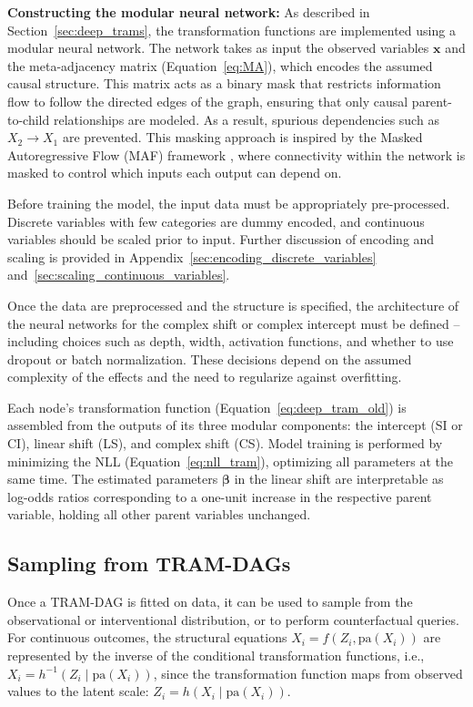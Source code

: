 \textbf{Constructing the modular neural network:} As described in Section~\ref{sec:deep_trams}, the transformation functions are implemented using a modular neural network. The network takes as input the observed variables $\mathbf{x}$ and the meta-adjacency matrix (Equation~\ref{eq:MA}), which encodes the assumed causal structure. This matrix acts as a binary mask that restricts information flow to follow the directed edges of the graph, ensuring that only causal parent-to-child relationships are modeled. As a result, spurious dependencies such as $X_2 \rightarrow X_1$ are prevented. This masking approach is inspired by the Masked Autoregressive Flow (MAF) framework \citep{papamakarios2017}, where connectivity within the network is masked to control which inputs each output can depend on.

Before training the model, the input data must be appropriately pre-processed. Discrete variables with few categories are dummy encoded, and continuous variables should be scaled prior to input. Further discussion of encoding and scaling is provided in Appendix~\ref{sec:encoding_discrete_variables} and~\ref{sec:scaling_continuous_variables}.

Once the data are preprocessed and the structure is specified, the architecture of the neural networks for the complex shift or complex intercept must be defined -- including choices such as depth, width, activation functions, and whether to use dropout or batch normalization. These decisions depend on the assumed complexity of the effects and the need to regularize against overfitting.

Each node's transformation function (Equation~\ref{eq:deep_tram_old}) is assembled from the outputs of its three modular components: the intercept (SI or CI), linear shift (LS), and complex shift (CS). Model training is performed by minimizing the NLL (Equation~\ref{eq:nll_tram}), optimizing all parameters at the same time. The estimated parameters $\boldsymbol{\beta}$ in the linear shift are interpretable as log-odds ratios corresponding to a one-unit increase in the respective parent variable, holding all other parent variables unchanged.




\subsection{Sampling from TRAM-DAGs} \label{methods:sampling}

Once a TRAM-DAG is fitted on data, it can be used to sample from the observational or interventional distribution, or to perform counterfactual queries. For continuous outcomes, the structural equations $X_i = f(Z_i, \text{pa}(X_i))$ are represented by the inverse of the conditional transformation functions, i.e., $X_i = h^{-1}(Z_i \mid \text{pa}(X_i))$, since the transformation function maps from observed values to the latent scale: $Z_i = h(X_i \mid \text{pa}(X_i))$.


